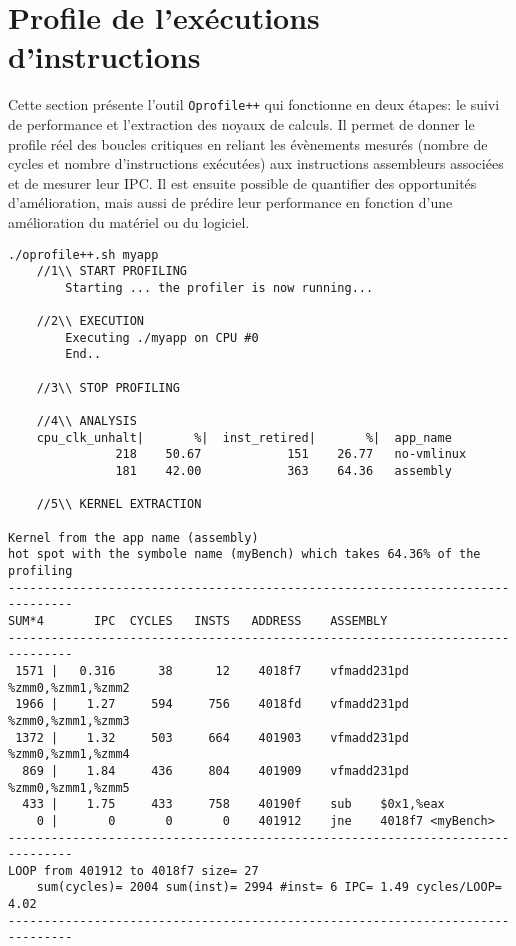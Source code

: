 \section{Profile de l'exécutions d'instructions}\label{sec:oprofile}


Cette section présente l'outil \verb=Oprofile++= qui fonctionne en deux étapes: le suivi de performance et l'extraction des noyaux de calculs. Il permet de donner le profile réel des boucles critiques en reliant les évènements mesurés (nombre de cycles et nombre d'instructions exécutées) aux instructions assembleurs associées et de mesurer leur IPC. Il est ensuite possible de quantifier des opportunités d'amélioration, mais aussi de prédire leur performance en fonction d’une amélioration du matériel ou du logiciel.


\begin{lstlisting}[label=lst:dev_op_example, caption=L'outil Oprofile++ permet d'extraire les instructions des noyaux de calculs à partir du code binaire de l'application et d'y associer des mesures d'évènements.]
./oprofile++.sh myapp
    //1\\ START PROFILING
        Starting ... the profiler is now running...
        
    //2\\ EXECUTION 
        Executing ./myapp on CPU #0
        End..
    
    //3\\ STOP PROFILING
    
    //4\\ ANALYSIS 
    cpu_clk_unhalt|       %|  inst_retired|       %|  app_name
               218    50.67            151    26.77   no-vmlinux
               181    42.00            363    64.36   assembly
    
    //5\\ KERNEL EXTRACTION

Kernel from the app name (assembly) 
hot spot with the symbole name (myBench) which takes 64.36% of the profiling
-------------------------------------------------------------------------------
SUM*4       IPC  CYCLES   INSTS   ADDRESS    ASSEMBLY
-------------------------------------------------------------------------------
 1571 |   0.316      38      12    4018f7    vfmadd231pd %zmm0,%zmm1,%zmm2
 1966 |    1.27     594     756    4018fd    vfmadd231pd %zmm0,%zmm1,%zmm3
 1372 |    1.32     503     664    401903    vfmadd231pd %zmm0,%zmm1,%zmm4
  869 |    1.84     436     804    401909    vfmadd231pd %zmm0,%zmm1,%zmm5
  433 |    1.75     433     758    40190f    sub    $0x1,%eax
    0 |       0       0       0    401912    jne    4018f7 <myBench>
-------------------------------------------------------------------------------
LOOP from 401912 to 4018f7 size= 27
    sum(cycles)= 2004 sum(inst)= 2994 #inst= 6 IPC= 1.49 cycles/LOOP= 4.02
-------------------------------------------------------------------------------
\end{lstlisting}

